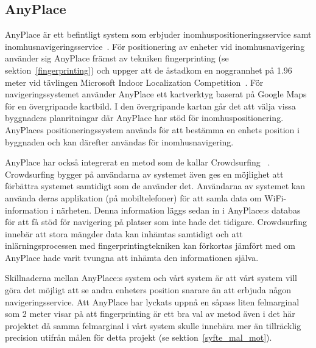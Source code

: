 \documentclass[a4paper,12pt]{article}
\begin{document}
 \subsection{AnyPlace}
 AnyPlace är ett befintligt system som erbjuder inomhuspositioneringsservice samt inomhusnavigeringsservice~\cite{anyplace}. För positionering av enheter vid inomhusnavigering använder sig AnyPlace främst av tekniken fingerprinting (se sektion~\ref{fingerprinting}) och uppger att de åstadkom en noggrannhet på 1.96 meter vid tävlingen Microsoft Indoor Localization Competition~\cite{IPS_tavling}.
 För navigeringssystemet använder AnyPlace ett kartverktyg baserat på Google Maps för en övergripande kartbild. I den övergripande kartan går det att välja vissa byggnaders planritningar där AnyPlace har stöd för inomhuspositionering. AnyPlaces positioneringssystem används för att bestämma en enhets position i byggnaden och kan därefter användas för inomhusnavigering.

 AnyPlace har också integrerat en metod som de kallar Crowdsurfing ~\cite{anyplace}. Crowdsurfing bygger på användarna av systemet även ges en möjlighet att förbättra systemet samtidigt som de använder det. Användarna av systemet kan använda deras applikation (på mobiltelefoner) för att samla data om WiFi-information i närheten. Denna information läggs sedan in i AnyPlace:s databas för att få stöd för navigering på platser som inte hade det tidigare. Crowdsurfing innebär att stora mängder data kan inhämtas samtidigt och att inlärningsprocessen med fingerprintingtekniken kan förkortas jämfört med om AnyPlace hade varit tvungna att inhämta den informationen själva.

 Skillnaderna mellan AnyPlace:s system och vårt system är att vårt system vill göra det möjligt att se andra enheters position snarare än att erbjuda någon navigeringsservice. Att AnyPlace har lyckats uppnå en såpass liten felmarginal som 2 meter visar på att fingerprinting är ett bra val av metod även i det här projektet då samma felmarginal i vårt system skulle innebära mer än tillräcklig precision utifrån målen för detta projekt (se sektion~\ref{syfte_mal_mot}).

\end{document}
